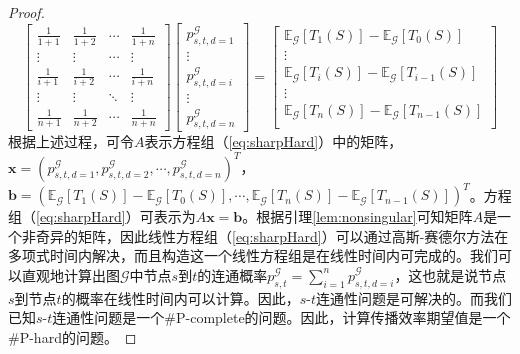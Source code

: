\begin{proof}
\begin{equation}
    \begin{bmatrix}
    \frac{1}{1+1} & \frac{1}{1+2} & \cdots & \frac{1}{1+n} \\
    \vdots & \vdots & \cdots & \vdots \\
    \frac{1}{i+1} & \frac{1}{i+2} & \cdots & \frac{1}{i+n} \\
    \vdots & \vdots & \ddots & \vdots \\
    \frac{1}{n+1} & \frac{1}{n+2} & \cdots & \frac{1}{n+n}
    \end{bmatrix}
    \begin{bmatrix}
    p^\mathcal{G}_{s,t,d=1}\\
    \vdots\\
    p^\mathcal{G}_{s,t,d=i}\\
    \vdots\\
    p^\mathcal{G}_{s,t,d=n}
    \end{bmatrix}
    =
    \begin{bmatrix}
    \mathbb{E}_\mathcal{G}\left[T_1\left(S\right)\right] - \mathbb{E}_\mathcal{G}\left[T_0\left(S\right)\right]\\
    \vdots\\
    \mathbb{E}_\mathcal{G}\left[T_i\left(S\right)\right] - \mathbb{E}_\mathcal{G}\left[T_{i-1}\left(S\right)\right]\\
    \vdots\\
    \mathbb{E}_\mathcal{G}\left[T_n\left(S\right)\right] - \mathbb{E}_\mathcal{G}\left[T_{n-1}\left(S\right)\right]\\
    \end{bmatrix}
\end{equation}
根据上述过程，可令$A$表示方程组（\ref{eq:sharpHard}）中的矩阵，$\mathbf{x} = \left(p^\mathcal{G}_{s,t,d=1},p^\mathcal{G}_{s,t,d=2},\cdots,p^\mathcal{G}_{s,t,d=n}\right)^T$，$\mathbf{b}=\left(\mathbb{E}_\mathcal{G} \left[T_1\left(S\right)\right] - \mathbb{E}_\mathcal{G}\left[T_0\left(S\right)\right],\cdots,\mathbb{E}_\mathcal{G}\left[T_n\left(S\right)\right] - \mathbb{E}_\mathcal{G}\left[T_{n-1}\left(S\right)\right]\right)^T$。方程组（\ref{eq:sharpHard}）可表示为$A\mathbf{x}=\mathbf{b}$。根据引理\ref{lem:nonsingular}可知矩阵$A$是一个非奇异的矩阵，因此线性方程组（\ref{eq:sharpHard}）可以通过高斯-赛德尔方法在多项式时间内解决，而且构造这一个线性方程组是在线性时间内可完成的。我们可以直观地计算出图$\mathcal{G}$中节点$s$到$t$的连通概率$p^\mathcal{G}_{s,t}=\sum_{i=1}^n{p^\mathcal{G}_{s,t,d=i}}$，这也就是说节点$s$到节点$t$的概率在线性时间内可以计算。因此，$s$-$t$连通性问题是可解决的。而我们已知$s$-$t$连通性问题是一个\#P-complete的问题。因此，计算传播效率期望值是一个\#P-hard的问题。
\end{proof}

